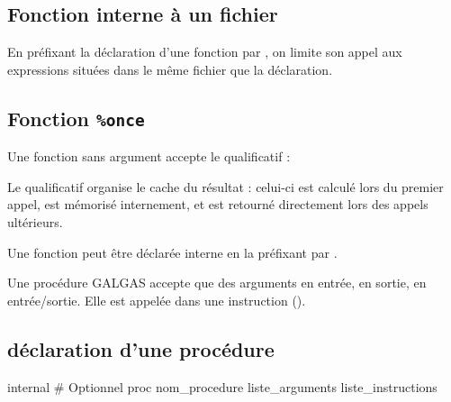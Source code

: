\subsection{Fonction interne à un fichier}

En préfixant la déclaration d'une fonction par , on limite son appel aux expressions situées dans le même fichier que la déclaration.




\subsection{Fonction \texttt{\%once}}

Une fonction sans argument accepte le qualificatif  :


Le qualificatif  organise le cache du résultat : celui-ci est calculé lors du premier appel, est mémorisé internement, et est retourné directement lors des appels ultérieurs.

Une fonction  peut être déclarée interne en la préfixant par .







Une procédure GALGAS accepte que des arguments en entrée, en sortie, en entrée/sortie. Elle est appelée dans une instruction ().

\subsection{déclaration d'une procédure}

\begin{galgascode}
internal # Optionnel
proc nom_procedure liste_arguments {
  liste_instructions
}
\end{galgascode}


